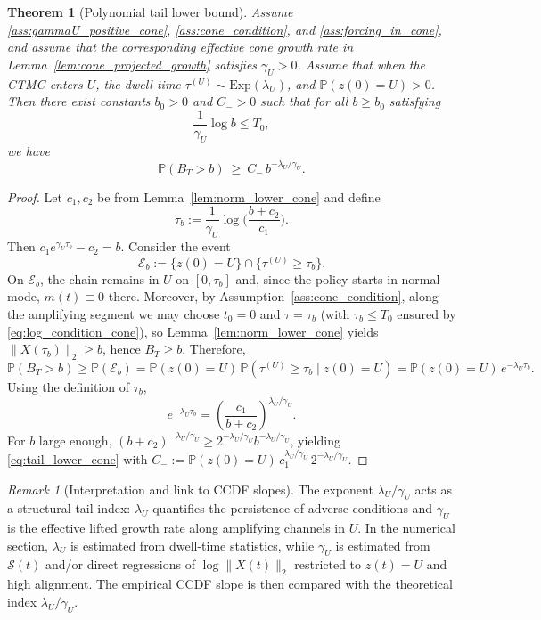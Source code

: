 \documentclass[12pt,a4paper]{article}
\newtheorem{theorem}{Theorem}
\theoremstyle{definition}
\theoremstyle{remark}
\newtheorem{remark}{Remark}
\begin{document}
\begin{theorem}[Polynomial tail lower bound]\label{thm:poly_tail_cone}
	Assume \ref{ass:gammaU_positive_cone}, \ref{ass:cone_condition}, and \ref{ass:forcing_in_cone}, and assume that the corresponding
	effective cone growth rate in Lemma~\ref{lem:cone_projected_growth} satisfies $\gamma_U>0$.
	Assume that when the CTMC enters $U$, the dwell time $\tau^{(U)}\sim\mathrm{Exp}(\lambda_U)$, and $\mathbb{P}(z(0)=U)>0$.
	Then there exist constants $b_0>0$ and $C_->0$ such that for all $b\ge b_0$ satisfying
	\begin{equation}\label{eq:log_condition_cone}
		\frac{1}{\gamma_U}\log b \le T_0,
	\end{equation}
	we have
	\begin{equation}\label{eq:tail_lower_cone}
		\mathbb{P}(B_T>b)\ \ge\ C_-\,b^{-\lambda_U/\gamma_U}.
	\end{equation}
\end{theorem}

\begin{proof}
	Let $c_1,c_2$ be from Lemma~\ref{lem:norm_lower_cone} and define
	\[
	\tau_b:=\frac{1}{\gamma_U}\log\!\Big(\frac{b+c_2}{c_1}\Big).
	\]
	Then $c_1 e^{\gamma_U\tau_b}-c_2=b$. Consider the event
	\[
	\mathcal{E}_b:=\{z(0)=U\}\cap\{\tau^{(U)}\ge \tau_b\}.
	\]
	On $\mathcal{E}_b$, the chain remains in $U$ on $[0,\tau_b]$ and, since the policy starts in normal mode, $m(t)\equiv 0$ there.
	Moreover, by Assumption~\ref{ass:cone_condition}, along the amplifying segment we may choose $t_0=0$ and $\tau=\tau_b$
	(with $\tau_b\le T_0$ ensured by \eqref{eq:log_condition_cone}), so Lemma~\ref{lem:norm_lower_cone} yields
	$\|X(\tau_b)\|_2\ge b$, hence $B_T\ge b$. Therefore,
	\[
	\mathbb{P}(B_T>b)\ge \mathbb{P}(\mathcal{E}_b)
	=
	\mathbb{P}(z(0)=U)\,\mathbb{P}(\tau^{(U)}\ge \tau_b\mid z(0)=U)
	=
	\mathbb{P}(z(0)=U)\,e^{-\lambda_U\tau_b}.
	\]
	Using the definition of $\tau_b$,
	\[
	e^{-\lambda_U\tau_b}
	=
	\left(\frac{c_1}{b+c_2}\right)^{\lambda_U/\gamma_U}.
	\]
	For $b$ large enough, $(b+c_2)^{-\lambda_U/\gamma_U}\ge 2^{-\lambda_U/\gamma_U}b^{-\lambda_U/\gamma_U}$, yielding
	\eqref{eq:tail_lower_cone} with $C_-:=\mathbb{P}(z(0)=U)\,c_1^{\lambda_U/\gamma_U}\,2^{-\lambda_U/\gamma_U}$.
\end{proof}

\begin{remark}[Interpretation and link to CCDF slopes]\label{rem:tail_index_cone}
	The exponent $\lambda_U/\gamma_U$ acts as a structural tail index: $\lambda_U$ quantifies the persistence of adverse conditions
	and $\gamma_U$ is the effective lifted growth rate along amplifying channels in $U$.
	In the numerical section, $\lambda_U$ is estimated from dwell-time statistics, while $\gamma_U$ is estimated from
	$\mathcal{S}(t)$ and/or direct regressions of $\log\|X(t)\|_2$ restricted to $z(t)=U$ and high alignment.
	The empirical CCDF slope is then compared with the theoretical index $\lambda_U/\gamma_U$.
\end{remark}
\end{document}
